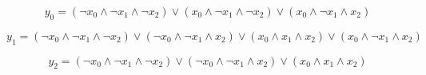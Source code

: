 \documentclass{scrartcl}
\begin{document}
	
$$y_0 = ( \lnot x_0 \wedge  \lnot x_1 \wedge  \lnot x_2) \lor (x_0 \wedge  \lnot x_1 \wedge  \lnot x_2) \lor (x_0 \wedge  \lnot x_1 \wedge x_2)$$

$$y_1 = ( \lnot x_0 \wedge  \lnot x_1 \wedge  \lnot x_2) \lor ( \lnot x_0 \wedge  \lnot x_1 \wedge x_2) \lor (x_0 \wedge x_1 \wedge x_2) \lor (x_0 \wedge  \lnot x_1 \wedge x_2)$$

$$y_2 = ( \lnot x_0 \wedge  \lnot x_1 \wedge  \lnot x_2) \lor ( \lnot x_0 \wedge  \lnot x_1 \wedge x_2) \lor (x_0 \wedge x_1 \wedge x_2)$$
\end{document}
